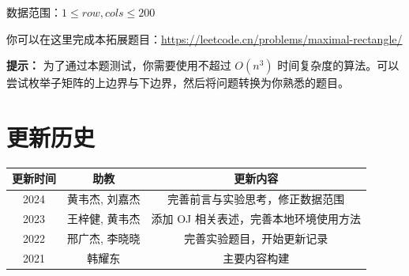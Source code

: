 \documentclass[12pt,a4paper]{article}
\begin{document}
数据范围：$1\le row, cols \le 200$

你可以在这里完成本拓展题目：\href{https://leetcode.cn/problems/maximal-rectangle/}{https://leetcode.cn/problems/maximal-rectangle/}

\textbf{提示：} 为了通过本题测试，你需要使用不超过 $O(n^3)$ 时间复杂度的算法。可以尝试枚举子矩阵的上边界与下边界，然后将问题转换为你熟悉的题目。

\section*{更新历史}

\begin{center}
    \begin{tabular}{|c|c|c|}
        \hline
        \textbf{更新时间} & \textbf{助教} & \textbf{更新内容} \\
        \hline
        2024 & 黄韦杰, 刘嘉杰 & 完善前言与实验思考，修正数据范围\\
        2023 & 王梓健, 黄韦杰 & 添加 OJ 相关表述，完善本地环境使用方法 \\
        2022 & 邢广杰, 李晓晓 & 完善实验题目，开始更新记录 \\
        2021 & 韩耀东 & 主要内容构建 \\
        \hline
        \end{tabular}
\end{center}
\end{document}

